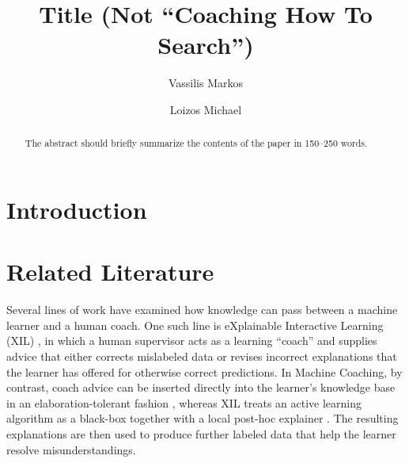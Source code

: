 \documentclass[runningheads]{llncs}
\newcommand{\ednote}[1]{\marginpar{\flushleft\tiny\sf\color{red}{#1}}}
\begin{document}
%
\title{Title (Not ``Coaching How To Search'')}
%
%
\author{Vassilis Markos \and
Loizos Michael}
%
%
%
\maketitle              %
%
\begin{abstract}
The abstract should briefly summarize the contents of the paper in
150--250 words.

\end{abstract}
%
%
%
\section{Introduction}\label{sec:Introduction}
%
\ednote{This should frame the work either as "implementations" of Machine Coaching --- statistical vs symbolic or so --- or as exploring problems which can be easily solved by (symbolic) Machine Coaching efficiently and providing full control over how the agent behaves vs formally not-guaranteed methods.}
%
%
%
\section{Related Literature}\label{sec:Related Literature}
%
\ednote{Reinforcement learning approaches might precede in this section.}
Several lines of work have examined how knowledge can pass between a machine learner and a human coach. One such line is eXplainable Interactive Learning (XIL) \cite{tesoKerstingIML2019}, in which a human supervisor acts as a learning ``coach'' and supplies advice that either corrects mislabeled data or revises incorrect explanations that the learner has offered for otherwise correct predictions. In Machine Coaching, by contrast, coach advice can be inserted directly into the learner's knowledge base in an elaboration-tolerant fashion \cite{mccarthyElaborationTolerance1998}, whereas XIL treats an active learning algorithm as a black-box \cite{Settles2009ActiveLL} together with a local post-hoc explainer \cite{ribeiro2016}. The resulting explanations are then used to produce further labeled data that help the learner resolve misunderstandings.
\end{document}
